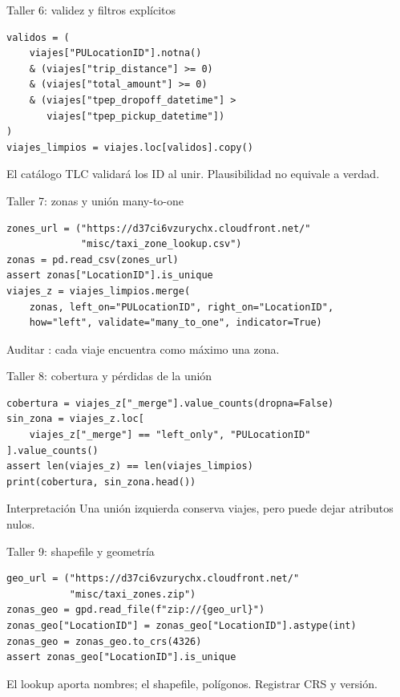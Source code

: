 \documentclass[aspectratio=169,11pt]{beamer}
\newcommand{\codigo}[1]{\texttt{\detokenize{#1}}}
\begin{document}
\begin{frame}[fragile]{Taller 6: validez y filtros explícitos}
\begin{verbatim}
validos = (
    viajes["PULocationID"].notna()
    & (viajes["trip_distance"] >= 0)
    & (viajes["total_amount"] >= 0)
    & (viajes["tpep_dropoff_datetime"] >
       viajes["tpep_pickup_datetime"])
)
viajes_limpios = viajes.loc[validos].copy()
\end{verbatim}
  \small El catálogo TLC validará los ID al unir. Plausibilidad no equivale a verdad.
\end{frame}

\begin{frame}[fragile]{Taller 7: zonas y unión many-to-one}
\begin{verbatim}
zones_url = ("https://d37ci6vzurychx.cloudfront.net/"
             "misc/taxi_zone_lookup.csv")
zonas = pd.read_csv(zones_url)
assert zonas["LocationID"].is_unique
viajes_z = viajes_limpios.merge(
    zonas, left_on="PULocationID", right_on="LocationID",
    how="left", validate="many_to_one", indicator=True)
\end{verbatim}
  \small Auditar \codigo{_merge}: cada viaje encuentra como máximo una zona.
\end{frame}

\begin{frame}[fragile]{Taller 8: cobertura y pérdidas de la unión}
\begin{verbatim}
cobertura = viajes_z["_merge"].value_counts(dropna=False)
sin_zona = viajes_z.loc[
    viajes_z["_merge"] == "left_only", "PULocationID"
].value_counts()
assert len(viajes_z) == len(viajes_limpios)
print(cobertura, sin_zona.head())
\end{verbatim}
  \begin{block}{Interpretación}
    Una unión izquierda conserva viajes, pero puede dejar atributos nulos.
  \end{block}
\end{frame}

\begin{frame}[fragile]{Taller 9: shapefile y geometría}
\begin{verbatim}
geo_url = ("https://d37ci6vzurychx.cloudfront.net/"
           "misc/taxi_zones.zip")
zonas_geo = gpd.read_file(f"zip://{geo_url}")
zonas_geo["LocationID"] = zonas_geo["LocationID"].astype(int)
zonas_geo = zonas_geo.to_crs(4326)
assert zonas_geo["LocationID"].is_unique
\end{verbatim}
  \small El lookup aporta nombres; el shapefile, polígonos. Registrar CRS y versión.
\end{frame}
\end{document}

